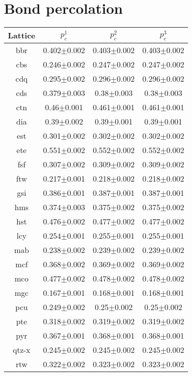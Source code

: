 \documentclass{article}
\begin{document}
 
 \section*{Bond percolation} 
 \begin{tabular}{|c|ccc|} 
\hline Lattice & $p_c^{1}$ & $p_c^{2}$ & $p_c^{3}$ \\ \hline 
bbr & 0.402$\pm$0.002 & 0.403$\pm$0.002 & 0.403$\pm$0.002 \\ 
cbs & 0.246$\pm$0.002 & 0.247$\pm$0.002 & 0.247$\pm$0.002 \\ 
cdq & 0.295$\pm$0.002 & 0.296$\pm$0.002 & 0.296$\pm$0.002 \\ 
cds & 0.379$\pm$0.003 & 0.38$\pm$0.003 & 0.38$\pm$0.003 \\ 
ctn & 0.46$\pm$0.001 & 0.461$\pm$0.001 & 0.461$\pm$0.001 \\ 
dia & 0.39$\pm$0.002 & 0.39$\pm$0.001 & 0.39$\pm$0.001 \\ 
est & 0.301$\pm$0.002 & 0.302$\pm$0.002 & 0.302$\pm$0.002 \\ 
ete & 0.551$\pm$0.002 & 0.552$\pm$0.002 & 0.552$\pm$0.002 \\ 
fsf & 0.307$\pm$0.002 & 0.309$\pm$0.002 & 0.309$\pm$0.002 \\ 
ftw & 0.217$\pm$0.001 & 0.218$\pm$0.002 & 0.218$\pm$0.002 \\ 
gsi & 0.386$\pm$0.001 & 0.387$\pm$0.001 & 0.387$\pm$0.001 \\ 
hms & 0.374$\pm$0.003 & 0.375$\pm$0.002 & 0.375$\pm$0.002 \\ 
hst & 0.476$\pm$0.002 & 0.477$\pm$0.002 & 0.477$\pm$0.002 \\ 
lcy & 0.254$\pm$0.001 & 0.255$\pm$0.001 & 0.255$\pm$0.001 \\ 
mab & 0.238$\pm$0.002 & 0.239$\pm$0.002 & 0.239$\pm$0.002 \\ 
mcf & 0.368$\pm$0.002 & 0.369$\pm$0.002 & 0.369$\pm$0.002 \\ 
mco & 0.477$\pm$0.002 & 0.478$\pm$0.002 & 0.478$\pm$0.002 \\ 
mgc & 0.167$\pm$0.001 & 0.168$\pm$0.001 & 0.168$\pm$0.001 \\ 
pcu & 0.249$\pm$0.002 & 0.25$\pm$0.002 & 0.25$\pm$0.002 \\ 
pte & 0.318$\pm$0.002 & 0.319$\pm$0.002 & 0.319$\pm$0.002 \\ 
pyr & 0.367$\pm$0.001 & 0.368$\pm$0.001 & 0.368$\pm$0.001 \\ 
qtz-x & 0.245$\pm$0.002 & 0.245$\pm$0.002 & 0.245$\pm$0.002 \\ 
rtw & 0.322$\pm$0.002 & 0.323$\pm$0.002 & 0.323$\pm$0.002 \\ 

\end{tabular}
\end{document}
